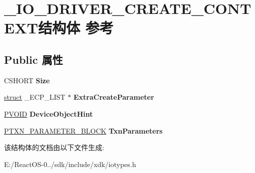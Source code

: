 \hypertarget{struct___i_o___d_r_i_v_e_r___c_r_e_a_t_e___c_o_n_t_e_x_t}{}\section{\+\_\+\+I\+O\+\_\+\+D\+R\+I\+V\+E\+R\+\_\+\+C\+R\+E\+A\+T\+E\+\_\+\+C\+O\+N\+T\+E\+X\+T结构体 参考}
\label{struct___i_o___d_r_i_v_e_r___c_r_e_a_t_e___c_o_n_t_e_x_t}
\subsection*{Public 属性}
\begin{DoxyCompactItemize}
\item 
\mbox{\label{struct___i_o___d_r_i_v_e_r___c_r_e_a_t_e___c_o_n_t_e_x_t_acea1e344507edce071e696654481b915}} 
C\+S\+H\+O\+RT {\bfseries Size}
\item 
\mbox{\label{struct___i_o___d_r_i_v_e_r___c_r_e_a_t_e___c_o_n_t_e_x_t_ab14caed709de52f3936e49476113c42f}} 
\hyperlink{interfacestruct}{struct} \+\_\+\+E\+C\+P\+\_\+\+L\+I\+ST $\ast$ {\bfseries Extra\+Create\+Parameter}
\item 
\mbox{\label{struct___i_o___d_r_i_v_e_r___c_r_e_a_t_e___c_o_n_t_e_x_t_a907ef85fb93e77ad7edf93f4e24fbd72}} 
\hyperlink{interfacevoid}{P\+V\+O\+ID} {\bfseries Device\+Object\+Hint}
\item 
\mbox{\label{struct___i_o___d_r_i_v_e_r___c_r_e_a_t_e___c_o_n_t_e_x_t_a655de50530405b0f1b4fc0de7c851f1a}} 
\hyperlink{struct___t_x_n___p_a_r_a_m_e_t_e_r___b_l_o_c_k}{P\+T\+X\+N\+\_\+\+P\+A\+R\+A\+M\+E\+T\+E\+R\+\_\+\+B\+L\+O\+CK} {\bfseries Txn\+Parameters}
\end{DoxyCompactItemize}


该结构体的文档由以下文件生成\+:\begin{DoxyCompactItemize}
\item 
E\+:/\+React\+O\+S-\/0../sdk/include/xdk/iotypes.\+h\end{DoxyCompactItemize}
